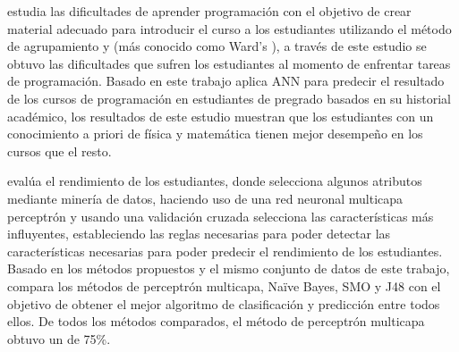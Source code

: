 
\textcite{lahtinen2005study} estudia las dificultades de aprender programación con el objetivo de crear material adecuado para introducir el curso a los estudiantes utilizando el método de agrupamiento  y  (más conocido como Ward's ), a través de este estudio se obtuvo las dificultades que sufren los estudiantes al momento de enfrentar tareas de programación. Basado en este trabajo \textcite{akinola2012data} aplica ANN para predecir el resultado de los cursos de programación en estudiantes de pregrado basados en su historial académico, los resultados de este estudio muestran que los estudiantes con un conocimiento a priori de física y matemática tienen mejor desempeño en los cursos que el resto.

\textcite{borkar2014attributes} evalúa el rendimiento de los estudiantes, donde selecciona algunos atributos mediante minería de datos, haciendo uso de una red neuronal multicapa perceptrón y usando una validación cruzada selecciona las características más influyentes, estableciendo las reglas necesarias para poder detectar las características necesarias para poder predecir el rendimiento de los estudiantes. Basado en los métodos propuestos y el mismo conjunto de datos de este trabajo, \textcite{jayakameswaraiah2014study} compara los métodos de perceptrón multicapa, Na\"ive Bayes, SMO y J48 con el objetivo de obtener el mejor algoritmo de clasificación y predicción entre todos ellos. De todos los métodos comparados, el método de perceptrón multicapa obtuvo un  de 75\%.




